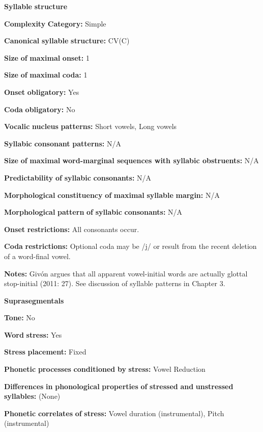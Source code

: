 \textbf{Syllable} \textbf{structure}

\textbf{Complexity} \textbf{Category:} Simple

\textbf{Canonical} \textbf{syllable} \textbf{structure:} CV(C) \citep[27-28]{Givón2011}

\textbf{Size} \textbf{of} \textbf{maximal} \textbf{onset:} 1

\textbf{Size} \textbf{of} \textbf{maximal} \textbf{coda:} 1

\textbf{Onset} \textbf{obligatory:} Yes

\textbf{Coda} \textbf{obligatory:} No

\textbf{Vocalic} \textbf{nucleus} \textbf{patterns:} Short vowels, Long vowels

\textbf{Syllabic} \textbf{consonant} \textbf{patterns:} N/A

\textbf{Size} \textbf{of} \textbf{maximal} \textbf{word{}-marginal sequences with syllabic obstruents:} N/A

\textbf{Predictability} \textbf{of} \textbf{syllabic} \textbf{consonants:} N/A

\textbf{Morphological} \textbf{constituency} \textbf{of} \textbf{maximal} \textbf{syllable} \textbf{margin:} N/A

\textbf{Morphological} \textbf{pattern} \textbf{of} \textbf{syllabic} \textbf{consonants:} N/A

\textbf{Onset} \textbf{restrictions:} All consonants occur.

\textbf{Coda} \textbf{restrictions:} Optional coda may be /j/ or result from the recent deletion of a word-final vowel. 

\textbf{Notes:} Givón argues that all apparent vowel-initial words are actually glottal stop-initial (2011: 27). See discussion of syllable patterns in Chapter 3.

\textbf{Suprasegmentals}

\textbf{Tone:} No

\textbf{Word} \textbf{stress:} Yes

\textbf{Stress} \textbf{placement:} Fixed

\textbf{Phonetic} \textbf{processes} \textbf{conditioned} \textbf{by} \textbf{stress:} Vowel Reduction

\textbf{Differences} \textbf{in} \textbf{phonological} \textbf{properties} \textbf{of} \textbf{stressed} \textbf{and} \textbf{unstressed} \textbf{syllables:} (None)

\textbf{Phonetic} \textbf{correlates} \textbf{of} \textbf{stress:} Vowel duration (instrumental), Pitch (instrumental)

